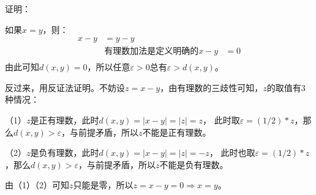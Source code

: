 \documentclass{article}
\theoremstyle{mystyle}
\begin{document}
证明：

如果$x=y$，则：
\begin{align*}
  x-y & = y-y \\ &\text{有理数加法是定义明确的}
  x-y & = 0   \\
\end{align*}
由此可知$d(x,y)=0$，所以任意$\varepsilon > 0$总有$\varepsilon > d(x,y)$。

反过来，用反证法证明。不妨设$z=x-y$，由有理数的三歧性可知，$z$的取值有3种情况：

（1）$z$是正有理数，此时$d(x,y)=|x-y|=|z|=z$，
此时取$\varepsilon = (1/2) * z$，那么$d(x,y) > \varepsilon$，与前提矛盾，所以$z$不能是正有理数。

（2）$z$是负有理数，此时$d(x,y)=|x-y|=|z|=-z$，
此时也取$\varepsilon = (1/2) * z$，那么$d(x,y) > \varepsilon$，与前提矛盾，所以$z$不能是负有理数。

由（1）（2）可知$z$只能是零，所以$z=x-y=0 \Rightarrow x=y$。
\end{document}
